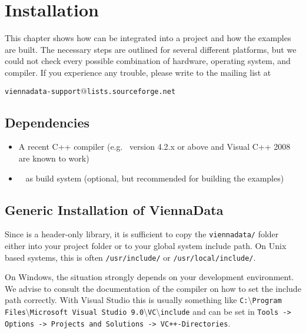 \chapter{Installation}



This chapter shows how {\ViennaData} can be integrated into a project and how
the examples are built. The necessary steps are outlined for several different
platforms, but we could not check every possible combination of hardware,
operating system, and compiler. If you experience any trouble, please write to
the mailing list at \\
\begin{center}
\texttt{viennadata-support$@$lists.sourceforge.net}
\end{center}


\section{Dependencies}
\label{dependencies}

\begin{itemize}
 \item A recent C++ compiler (e.g.~{\GCC} version 4.2.x or above and Visual C++
2008 are known to work)
 \item {\CMake}~\cite{cmake} as build system (optional, but recommended
for building the examples)
\end{itemize}


\section{Generic Installation of ViennaData} \label{sec:viennacl-installation}
Since {\ViennaData} is a header-only library, it is sufficient to copy the
\lstinline|viennadata/| folder either into your project folder or to your global system
include path. On Unix based systems, this is often \lstinline|/usr/include/| or
\lstinline|/usr/local/include/|.

On Windows, the situation strongly depends on your development environment. We
advise to consult the documentation of the compiler on how to set the include
path correctly. With Visual Studio this is usually something like
\texttt{C:$\setminus$Program Files$\setminus$Microsoft Visual Studio
9.0$\setminus$VC$\setminus$include}
and can be set in \texttt{Tools -> Options -> Projects and Solutions ->
VC++-\-Directories}.


